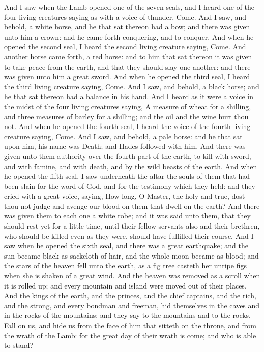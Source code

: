 And I saw when the Lamb opened one of the seven seals, and I heard one of the four living creatures saying as with a voice of thunder, Come. And I saw, and behold, a white horse, and he that sat thereon had a bow; and there was given unto him a crown: and he came forth conquering, and to conquer.  And when he opened the second seal, I heard the second living creature saying, Come. And another horse came forth, a red horse: and to him that sat thereon it was given to take peace from the earth, and that they should slay one another: and there was given unto him a great sword.  And when he opened the third seal, I heard the third living creature saying, Come. And I saw, and behold, a black horse; and he that sat thereon had a balance in his hand. And I heard as it were a voice in the midst of the four living creatures saying, A measure of wheat for a shilling, and three measures of barley for a shilling; and the oil and the wine hurt thou not.  And when he opened the fourth seal, I heard the voice of the fourth living creature saying, Come. And I saw, and behold, a pale horse: and he that sat upon him, his name was Death; and Hades followed with him. And there was given unto them authority over the fourth part of the earth, to kill with sword, and with famine, and with death, and by the wild beasts of the earth.  And when he opened the fifth seal, I saw underneath the altar the souls of them that had been slain for the word of God, and for the testimony which they held: and they cried with a great voice, saying, How long, O Master, the holy and true, dost thou not judge and avenge our blood on them that dwell on the earth? And there was given them to each one a white robe; and it was said unto them, that they should rest yet for a little time, until their fellow-servants also and their brethren, who should be killed even as they were, should have fulfilled their course.  And I saw when he opened the sixth seal, and there was a great earthquake; and the sun became black as sackcloth of hair, and the whole moon became as blood; and the stars of the heaven fell unto the earth, as a fig tree casteth her unripe figs when she is shaken of a great wind. And the heaven was removed as a scroll when it is rolled up; and every mountain and island were moved out of their places. And the kings of the earth, and the princes, and the chief captains, and the rich, and the strong, and every bondman and freeman, hid themselves in the caves and in the rocks of the mountains; and they say to the mountains and to the rocks, Fall on us, and hide us from the face of him that sitteth on the throne, and from the wrath of the Lamb: for the great day of their wrath is come; and who is able to stand? 

